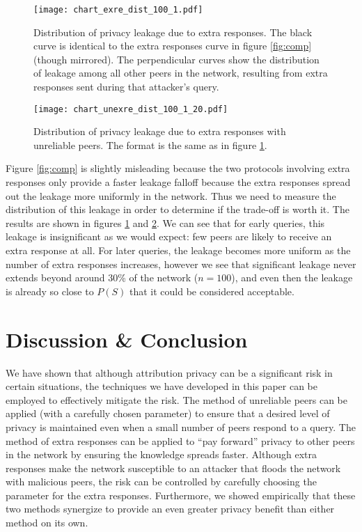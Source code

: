 \documentclass{article}
\newcommand{\figref}[1]{figure \ref{fig:#1}}
\newcommand{\Figref}[1]{Figure \ref{fig:#1}}
\begin{document}
\begin{figure}%
    \centering
	\texttt{[image: chart\_exre\_dist\_100\_1.pdf]}
	\caption{Distribution of privacy leakage due to extra responses. The black
	curve is identical to the extra responses curve in \figref{comp} (though
	mirrored). The perpendicular curves show the distribution of leakage among
	all other peers in the network, resulting from extra responses sent during
	that attacker's query.}
    \label{fig:exdist}%
\end{figure}

\begin{figure}%
    \centering
	\texttt{[image: chart\_unexre\_dist\_100\_1\_20.pdf]}
	\caption{Distribution of privacy leakage due to extra responses with
	unreliable peers. The format is the same as in \figref{exdist}.}
    \label{fig:uexdist}%
\end{figure}

\Figref{comp} is slightly misleading because the two protocols involving extra
responses only provide a faster leakage falloff because the extra responses
spread out the leakage more uniformly in the network. Thus we need to measure
the distribution of this leakage in order to determine if the trade-off is worth
it. The results are shown in figures \ref{fig:exdist} and \ref{fig:uexdist}. We
can see that for early queries, this leakage is insignificant as we would expect:
few peers are likely to receive an extra response at all. For later queries,
the leakage becomes more uniform as the number of extra responses increases,
however we see that significant leakage never extends beyond around 30\% of the
network ($n=100$), and even then the leakage is already so close to $P(S)$ that
it could be considered acceptable.

\section{Discussion \& Conclusion}

We have shown that although attribution privacy can be a significant risk in
certain situations, the techniques we have developed in this paper can be
employed to effectively mitigate the risk. The method of unreliable peers can be
applied (with a carefully chosen parameter) to ensure that a desired level of
privacy is maintained even when a small number of peers respond to a query.
The method of extra responses can be applied to ``pay
forward'' privacy to other peers in the network by ensuring the knowledge
spreads faster. Although extra responses make the network susceptible to an
attacker that floods the network with malicious peers, the risk can be
controlled by carefully choosing the parameter for the extra responses.
Furthermore, we showed empirically that these two methods synergize to provide
an even greater privacy benefit than either method on its own.
\end{document}
